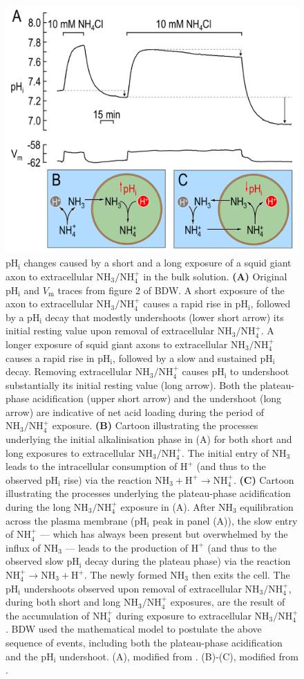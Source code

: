 \documentclass[fleqn,10pt]{physiome}
\begin{document}
\begin{figure}[ht]
\centering
\includegraphics[width=0.49\linewidth]{img/Figure 2.png}
\caption{\label{fig:2} $\mathrm{pH_i}$ changes caused by a short and a long exposure of a squid giant axon to extracellular $\mathrm{NH_3}/\mathrm{NH_4^+}$ in the bulk solution. \textbf{(A)} Original $\mathrm{pH_i}$ and $V_\mathrm{m}$ traces from figure 2 of BDW. A short exposure of the axon to extracellular $\mathrm{NH_3}/\mathrm{NH_4^+}$ causes a rapid rise in $\mathrm{pH_i}$, followed by a $\mathrm{pH_i}$ decay that modestly undershoots (lower short arrow) its initial resting value upon removal of extracellular $\mathrm{NH_3}/\mathrm{NH_4^+}$. A longer exposure of squid giant axons to extracellular $\mathrm{NH_3}/\mathrm{NH_4^+}$ causes a rapid rise in $\mathrm{pH_i}$, followed by a slow and sustained $\mathrm{pH_i}$ decay. Removing extracellular $\mathrm{NH_3}/\mathrm{NH_4^+}$ causes $\mathrm{pH_i}$ to undershoot substantially its initial resting value (long arrow). Both the plateau-phase acidification (upper short arrow) and the undershoot (long arrow) are indicative of net acid loading during the period of $\mathrm{NH_3}/\mathrm{NH_4^+}$ exposure. \textbf{(B)} Cartoon illustrating the processes underlying the initial alkalinisation phase in (A) for both short and long exposures to extracellular $\mathrm{NH_3}/\mathrm{NH_4^+}$. The initial entry of $\mathrm{NH_3}$ leads to the intracellular consumption of $\mathrm{H^+}$ (and thus to the observed $\mathrm{pH_i}$ rise) via the reaction $\mathrm{NH_3}+\mathrm{H^+} \longrightarrow \mathrm{NH^+_4}$. \textbf{(C)} Cartoon illustrating the processes underlying the plateau-phase acidification during the long $\mathrm{NH_3}/\mathrm{NH_4^+}$ exposure in (A). After $\mathrm{NH_3}$ equilibration across the plasma membrane ($\mathrm{pH_i}$ peak in panel (A)), the slow entry of $\mathrm{NH_4^+}$ --- which has always been present but overwhelmed by the influx of $\mathrm{NH_3}$ --- leads to the production of $\mathrm{H^+}$ (and thus to the observed slow $\mathrm{pH_i}$ decay during the plateau phase) via the reaction $\mathrm{NH^+_4} \longrightarrow \mathrm{NH_3}+\mathrm{H^+}$. The newly formed $\mathrm{NH_3}$ then exits the cell. The $\mathrm{pH_i}$ undershoots observed upon removal of extracellular $\mathrm{NH_3}/\mathrm{NH_4^+}$, during both short and long $\mathrm{NH_3}/\mathrm{NH_4^+}$ exposures, are the result of the accumulation of $\mathrm{NH_4^+}$ during exposure to extracellular $\mathrm{NH_3}/\mathrm{NH_4^+}$. BDW used the mathematical model to postulate the above sequence of events, including both the plateau-phase acidification and the $\mathrm{pH_i}$ undershoot. (A), modified from \cite{boron1976intracellular}. (B)-(C), modified from \cite{boron2010sharpey}.}

\end{figure}
\end{document}
